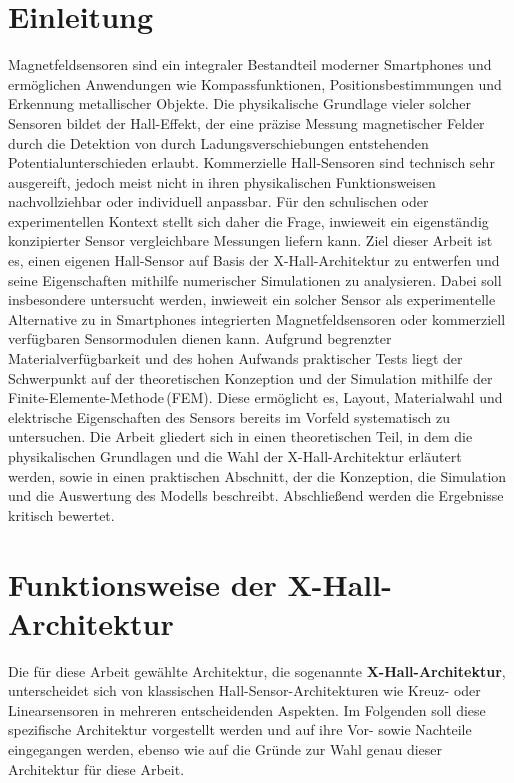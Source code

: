 \documentclass[12pt, a4paper]{article}
\begin{document}
\section{Einleitung}
Magnetfeldsensoren sind ein integraler Bestandteil moderner Smartphones und ermöglichen Anwendungen wie Kompassfunktionen, Positionsbestimmungen und Erkennung metallischer Objekte. Die physikalische Grundlage vieler solcher Sensoren bildet der Hall-Effekt, der eine präzise Messung magnetischer Felder durch die Detektion von durch Ladungsverschiebungen entstehenden Potentialunterschieden erlaubt.\newline
Kommerzielle Hall-Sensoren sind technisch sehr ausgereift, jedoch meist nicht in ihren physikalischen Funktionsweisen nachvollziehbar oder individuell anpassbar. Für den schulischen oder experimentellen Kontext stellt sich daher die Frage, inwieweit ein eigenständig konzipierter Sensor vergleichbare Messungen liefern kann.\newline
Ziel dieser Arbeit ist es, einen eigenen Hall-Sensor auf Basis der X-Hall-Architektur zu entwerfen und seine Eigenschaften mithilfe numerischer Simulationen zu analysieren. Dabei soll insbesondere untersucht werden, inwieweit ein solcher Sensor als experimentelle Alternative zu in Smartphones integrierten Magnetfeldsensoren oder kommerziell verfügbaren Sensormodulen dienen kann.\newline
Aufgrund begrenzter Materialverfügbarkeit und des hohen Aufwands praktischer Tests liegt der Schwerpunkt auf der theoretischen Konzeption und der Simulation mithilfe der Finite-Elemente-Methode\,(FEM). Diese ermöglicht es, Layout, Materialwahl und elektrische Eigenschaften des Sensors bereits im Vorfeld systematisch zu untersuchen.\newline
Die Arbeit gliedert sich in einen theoretischen Teil, in dem die physikalischen Grundlagen und die Wahl der X-Hall-Architektur erläutert werden, sowie in einen praktischen Abschnitt, der die Konzeption, die Simulation und die Auswertung des Modells beschreibt. Abschließend werden die Ergebnisse kritisch bewertet.


\section{Funktionsweise der X-Hall-Architektur}
Die für diese Arbeit gewählte Architektur, die sogenannte \textbf{X-Hall-Architektur}, unterscheidet sich von klassischen Hall-Sensor-Architekturen wie Kreuz- oder Linearsensoren in mehreren entscheidenden Aspekten. Im Folgenden soll diese spezifische Architektur vorgestellt werden und auf ihre Vor- sowie Nachteile eingegangen werden, ebenso wie auf die Gründe zur Wahl genau dieser %
Architektur für diese Arbeit.
\end{document}
